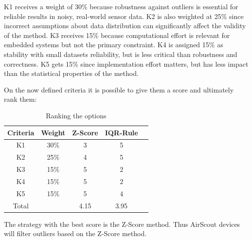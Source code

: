 K1 receives a weight of 30\% because robustness against outliers is essential for reliable results in noisy, real-world sensor data. K2 is also weighted at 25\% since incorrect assumptions about data distribution can significantly affect the validity of the method. K3 receives 15\% because computational effort is relevant for embedded systems but not the primary constraint. K4 is assigned 15\% as stability with small datasets reliability, but is less critical than robustness and correctness. K5 gets 15\% since implementation effort matters, but has less impact than the statistical properties of the method.

On the now defined criteria it is possible to give them a score and ultimately rank them:
\begin{table}[H]
    \centering
    \begin{tabular}{|c|c|c|c|c|}
    \hline
    Criteria & Weight & Z-Score & IQR-Rule\\
    \hline
    K1 & 30\% & 3 & 5\\
    K2 & 25\% & 4 & 5\\
    K3 & 15\% & 5 & 2\\
    K4 & 15\% & 5 & 2\\
    K5 & 15\% & 5 & 4\\
    \hline
    Total & & 4.15 & 3.95\\
    \hline
    \end{tabular}
    \caption{Ranking the options}
    \label{tab:placeholder}
\end{table}

The strategy with the best score is the Z-Score method. Thus AirScout devices will filter outliers based on the Z-Score method.